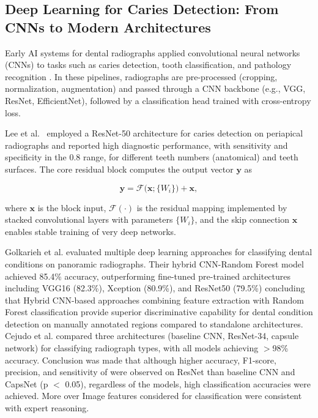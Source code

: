 \documentclass[12pt,a4paper]{report}
\begin{document}
	\subsection{Deep Learning for Caries Detection: From CNNs to Modern Architectures}
	
	Early AI systems for dental radiographs applied convolutional neural networks (CNNs) to tasks such as caries detection, tooth classification, and pathology recognition \cite{litjens2017survey,schwendicke2021demystifying_ai}. In these pipelines, radiographs are pre-processed (cropping, normalization, augmentation) and passed through a CNN backbone (e.g., VGG, ResNet, EfficientNet), followed by a classification head trained with cross-entropy loss.
	
	Lee et al.~\cite{lee2019deep} employed a ResNet-50 architecture for caries detection on
	periapical radiographs and reported high diagnostic performance, with sensitivity and
	specificity in the 0.8 range, for different teeth numbers (anatomical) and teeth surfaces. The core residual block computes the output vector
	\(\boldsymbol{y}\) as
	
	\begin{equation}
		\boldsymbol{y} = \mathcal{F}\bigl(\boldsymbol{x}; \{W_i\}\bigr) + \boldsymbol{x},
		\label{eq:residual-block}
	\end{equation}
	
	where \(\boldsymbol{x}\) is the block input, \(\mathcal{F}(\cdot)\) is the residual mapping
	implemented by stacked convolutional layers with parameters \(\{W_i\}\), and the skip
	connection \(\boldsymbol{x}\) enables stable training of very deep networks.
	
	Golkarieh et al. \cite{Golkarieh2025DeepDentalPanoramic} evaluated multiple deep learning approaches for classifying dental conditions on panoramic radiographs. Their hybrid CNN-Random Forest model achieved 85.4\% accuracy, outperforming fine-tuned pre-trained architectures including VGG16 (82.3\%), Xception (80.9\%), and ResNet50 (79.5\%) concluding that Hybrid CNN-based approaches combining feature extraction with Random Forest classification provide superior discriminative capability for dental condition detection on manually annotated regions compared to standalone architectures. Cejudo et al. \cite{cejudo2021classification_radiographs} compared three architectures (baseline CNN, ResNet-34, capsule network) for classifying radiograph types, with all models achieving $>$98\% accuracy. Conclusion was made that although higher accuracy, F1-score, precision, and sensitivity of were observed on ResNet than baseline CNN and CapsNet (p $<$ 0.05), regardless of the models, high classification accuracies were achieved. More over Image features considered for classification were consistent with expert reasoning.
	
\end{document}
